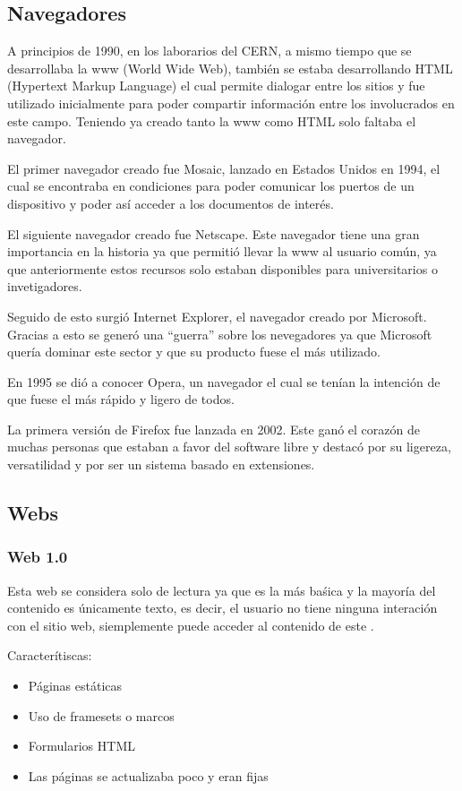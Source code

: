 \documentclass{article}
\begin{document}
\subsection{Navegadores}
A principios de 1990, en los laborarios del CERN, a mismo tiempo que se
desarrollaba la www (World Wide Web), también se estaba desarrollando HTML
(Hypertext Markup Language) el cual permite dialogar entre los sitios y fue
utilizado inicialmente para poder compartir información entre los involucrados
en este campo. Teniendo ya creado tanto la www como HTML solo faltaba el
navegador\cite{navs}.

El primer navegador creado fue Mosaic, lanzado en Estados Unidos en 1994, el cual
se encontraba en condiciones para poder comunicar los puertos de un
dispositivo y poder así acceder a los documentos de interés.

El siguiente navegador creado fue Netscape. Este navegador tiene una gran
importancia en la historia ya que permitió llevar la www al usuario común, ya
que anteriormente estos recursos solo estaban disponibles para universitarios
o invetigadores.

Seguido de esto surgió Internet Explorer, el navegador creado por Microsoft.
Gracias a esto se generó una ``guerra'' sobre los nevegadores ya que Microsoft
quería dominar este sector y que su producto fuese el más utilizado.

En 1995 se dió a conocer Opera, un navegador el cual se tenían la intención de
que fuese el más rápido y ligero de todos.

La primera versión de Firefox fue lanzada en 2002. Este ganó el corazón de
muchas personas que estaban a favor del software libre y destacó por su
ligereza, versatilidad y por ser un sistema basado en extensiones\cite{navs}.

\subsection{Webs}

\subsubsection{Web 1.0}
Esta web se considera solo de lectura ya que es la más baśica y la mayoría del
contenido es únicamente texto, es decir, el usuario no tiene ninguna interación
con el sitio web, siemplemente puede acceder al contenido de este \cite{webs}.

Caracterítiscas:
\begin{itemize}
	\item Páginas estáticas
	\item Uso de framesets o marcos
	\item Formularios HTML
	\item Las páginas se actualizaba poco y eran fijas
\end{itemize}
\end{document}
